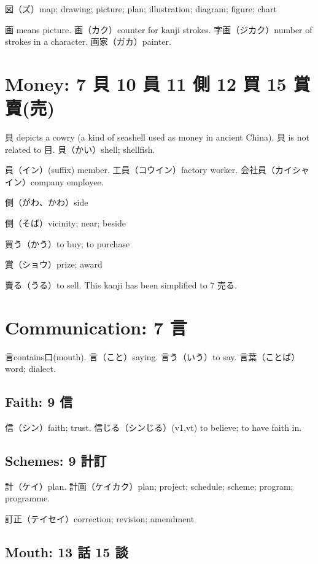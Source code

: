 図（ズ）map; drawing; picture; plan; illustration; diagram; figure; chart

画 means picture.
画（カク）counter for kanji strokes.
字画（ジカク）number of strokes in a character.
画家（ガカ）painter.

\section{Money: 7 貝 10 員 11 側 12 買 15 賞賣(売)}

貝 depicts a cowry (a kind of seashell used as money in ancient China).
貝 is not related to 目.
貝（かい）shell; shellfish.

員（イン）(suffix) member.
工員（コウイン）factory worker.
会社員（カイシャイン）company employee.

側（がわ、かわ）side

側（そば）vicinity; near; beside

買う（かう）to buy; to purchase

賞（ショウ）prize; award

賣る（うる）to sell.
This kanji has been simplified to 7 売る.

\section{Communication: 7 言}

言contains口(mouth).
言（こと）saying.
言う（いう）to say.
言葉（ことば）word; dialect.

\subsection{Faith: 9 信}

信（シン）faith; trust.
信じる（シンじる）(v1,vt) to believe; to have faith in.

\subsection{Schemes: 9 計訂}

計（ケイ）plan.
計画（ケイカク）plan; project; schedule; scheme; program; programme.

訂正（テイセイ）correction; revision; amendment

\subsection{Mouth: 13 話 15 談}

